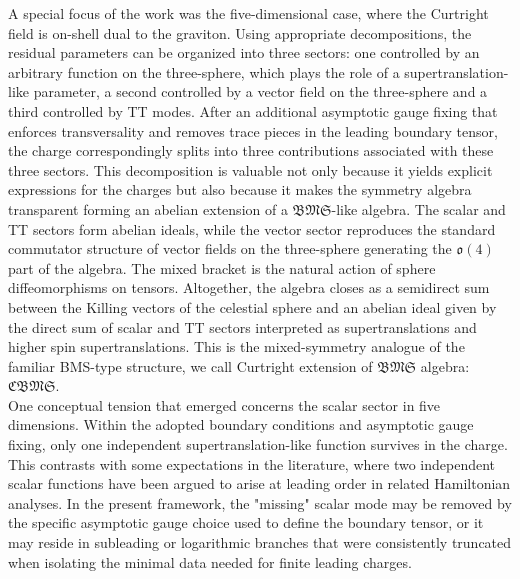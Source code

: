 \documentclass[a4paper,12pt]{article}
\begin{document}
A special focus of the work was the five-dimensional case, where the Curtright field is on-shell dual to the graviton. Using appropriate decompositions, the residual parameters can be organized into three sectors: one controlled by an arbitrary function on the three-sphere, which plays the role of a supertranslation-like parameter, a second controlled by a vector field on the three-sphere and a third controlled by TT modes. After an additional asymptotic gauge fixing that enforces transversality and removes trace pieces in the leading boundary tensor, the charge correspondingly splits into three contributions associated with these three sectors. This decomposition is valuable not only because it yields explicit expressions for the charges but also because it makes the symmetry algebra transparent forming an abelian extension of a $\mathfrak{BMS}$-like algebra. The scalar and TT sectors form abelian ideals, while the vector sector reproduces the standard commutator structure of vector fields on the three-sphere generating the $\mathfrak{o}(4)$ part of the algebra. The mixed bracket is the natural action of sphere diffeomorphisms on tensors. Altogether, the algebra closes as a semidirect sum between the Killing vectors of the celestial sphere and an abelian ideal given by the direct sum of scalar and TT sectors interpreted as supertranslations and higher spin supertranslations. This is the mixed-symmetry analogue of the familiar BMS-type structure, we call Curtright extension of $\mathfrak{BMS}$ algebra: $\mathfrak{CBMS}$.\\
One conceptual tension that emerged concerns the scalar sector in five dimensions. Within the adopted boundary conditions and asymptotic gauge fixing, only one independent supertranslation-like function survives in the charge. This contrasts with some expectations in the literature, where two independent scalar functions have been argued to arise at leading order in related Hamiltonian analyses. In the present framework, the "missing" scalar mode may be removed by the specific asymptotic gauge choice used to define the boundary tensor, or it may reside in subleading or logarithmic branches that were consistently truncated when isolating the minimal data needed for finite leading charges.
\end{document}
